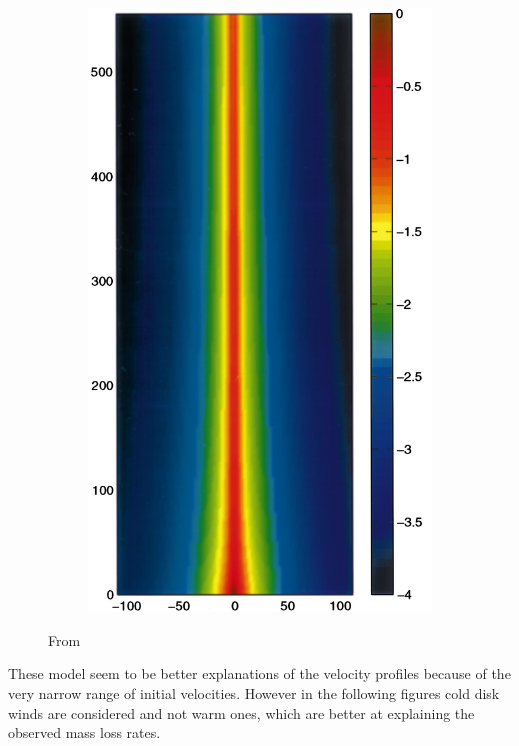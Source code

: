 \documentclass[10pt,a4paper,english]{article}
\begin{document}
\begin{figure}[!ht]
\begin{subfigure}[t]{0.345\columnwidth}
    \includegraphics[width=\columnwidth]{figures/shang1998-2big.png}
  \end{subfigure}
  \caption{From \cite{Shang1998}}
\end{figure}

These model seem to be better explanations of the velocity profiles because of
the very narrow range of initial velocities. However in the following figures
 cold disk winds are considered and not warm ones,
which are better at explaining the observed mass loss rates.
\end{document}
